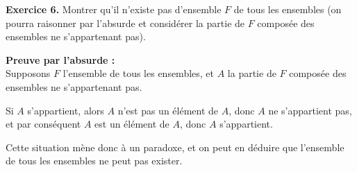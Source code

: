 \documentclass[a4paper, 10pt]{report}
\begin{document}
	\vspace{5mm}
	\noindent
	{\color{red}\textbf{Exercice 6.}}
	Montrer qu'il n'existe pas d'ensemble $F$ de tous les ensembles
	(on pourra raisonner par l'absurde et considérer la partie de $F$
	composée des ensembles ne s'appartenant pas).
		
	\colorbox{solution}
	{
		\begin{minipage}{0.9\textwidth}
			\textbf{Preuve par l'absurde :}\\
			Supposons $F$ l'ensemble de tous les ensembles, et $A$ la
			partie de $F$ composée des ensembles ne s'appartenant pas.
			
			Si $A$ s'appartient, alors $A$ n'est pas un élément de $A$,
			donc $A$ ne s'appartient pas, et par conséquent $A$ est
			un élément de $A$, donc $A$ s'appartient.
			
			Cette situation mène donc à un paradoxe, et on peut en
			déduire que l'ensemble de tous les ensembles ne peut pas
			exister.
		\end{minipage}
	}
	
\end{document}
